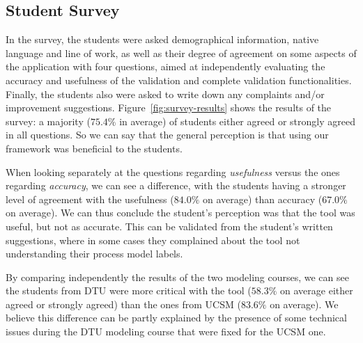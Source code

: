 


\subsection{Student Survey}
\label{sec:questionaires}

In the survey, the students were asked demographical information, native language and line of work, as well as their degree of agreement on some aspects of the application with four questions, aimed at independently evaluating the accuracy and usefulness of the validation and complete validation functionalities. Finally, the students also were asked to write down any complaints and/or improvement suggestions.
Figure~\ref{fig:survey-results} shows the results of the survey: 
a majority ($75.4\%$ in average) of students either agreed or strongly agreed in all questions. So we can say that the general perception is that using our framework was beneficial to the students. 

When looking separately at the questions regarding \emph{usefulness} versus the ones regarding \emph{accuracy}, we can see a difference, with the students having a stronger level of agreement with the usefulness ($84.0\%$ on average) than accuracy ($67.0\%$ on average). We can thus conclude the student's perception was that the tool was useful, but not as accurate. This can be validated from the student's written suggestions, where in some cases they complained about the tool not understanding their process model labels.

By comparing independently the results of the two modeling courses, we can see the students from DTU were more critical with the tool ($58.3\%$ on average either agreed or strongly agreed) than the ones from UCSM ($83.6\%$ on average). We believe this difference can be partly explained by the presence of some technical issues during the DTU modeling course that were fixed for the UCSM one.


